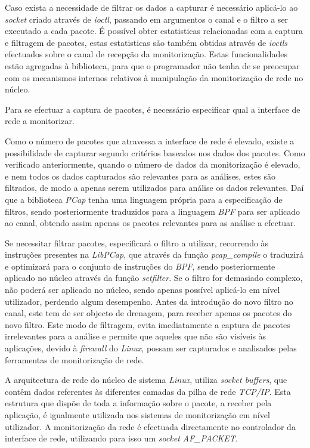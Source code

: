Caso exista a necessidade de filtrar os dados a capturar é necessário aplicá-lo ao \textit{socket} criado através de \textit{ioctl}, passando em argumentos o canal e o filtro a ser executado a cada pacote.
É possível obter estatisticas relacionadas com a captura e filtragem de pacotes, estas estatisticas são também obtidas através de \textit{ioctls} efectuados sobre o canal de recepção da monitorização.
Estas funcionalidades estão agregadas à biblioteca, para que o programador não tenha de se preocupar com os mecanismos internos relativos à manipulação da monitorização de rede no núcleo.

Para se efectuar a captura de pacotes, é necessário especificar qual a interface de rede a monitorizar.

Como o número de pacotes que atravessa a interface de rede é elevado, existe a possibilidade de capturar segundo critérios baseados nos dados dos pacotes.
Como verificado anteriormente, quando o número de dados da monitorização é elevado, e nem todos os dados capturados são relevantes para as análises, estes são filtrados, de modo a apenas serem utilizados para análise os dados relevantes.
Daí que a biblioteca \textit{PCap} tenha uma linguagem própria para a especificação de filtros, sendo posteriormente traduzidos para a linguagem \textit{BPF} para ser aplicado ao canal, obtendo assim apenas os pacotes relevantes para as análise a efectuar.

Se necessitar filtrar pacotes, especificará o filtro a utilizar, recorrendo às instruções presentes na \textit{LibPCap}, que através da função  \textit{pcap\_compile} o traduzirá e optimizará para o conjunto de instruções do \textit{BPF}, sendo posteriormente aplicado no núcleo através da função \textit{setfilter}.
Se o filtro for demasiado complexo, não poderá ser aplicado no núcleo, sendo apenas possível aplicá-lo em nível utilizador, perdendo algum desempenho.
Antes da introdução do novo filtro no canal, este tem de ser objecto de drenagem, para receber apenas os pacotes do novo filtro.
Este modo de filtragem, evita imediatamente a captura de pacotes irrelevantes para a análise e permite que aqueles que não são visíveis às aplicações, devido à \textit{firewall} do \textit{Linux}, possam ser capturados e analisados pelas ferramentas de monitorização de rede.

A arquitectura de rede do núcleo de sistema \textit{Linux}, utiliza \textit{socket buffers}, que contêm dados referentes às diferentes camadas da pilha de rede \textit{TCP/IP}.
Esta estrutura que dispõe de toda a informação sobre o pacote, a receber pela aplicação, é igualmente utilizada nos sistemas de monitorização em nível utilizador.
A monitorização da rede é efectuada directamente no controlador da interface de rede, utilizando para isso um \textit{socket} \textit{AF\_PACKET}.

